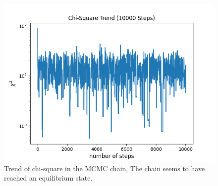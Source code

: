\documentclass[12pt, TexShade, letterpaper]{report}
\begin{document}
\begin{figure}[h!]
\centering
\includegraphics[scale =0.6]{csq_trend_knwon_curve.png}
\caption[Trend of chi-square]{Trend of chi-square in the MCMC chain, The chain seems to have reached an equilibrium state.}
\label{fig:csq_trend_knwon_curve}
\end{figure}
\end{document}
